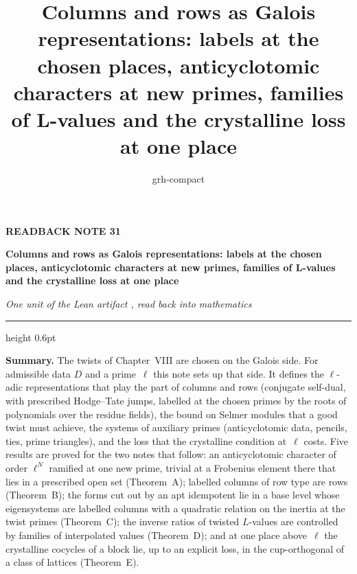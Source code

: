\documentclass[11pt,a4paper]{article}
\title{Columns and rows as Galois representations: labels at the chosen places, anticyclotomic characters at new primes, families of L-values and the crystalline loss at one place}
\author{grh-compact}
\date{}
\theoremstyle{plainx}
\theoremstyle{uprightx}
\begin{document}
\color{ink}

{\raggedright
{\sffamily\bfseries\fontsize{7.2}{9}\selectfont\color{leancol}READBACK NOTE 31\par}
\vspace{5pt}
{\fontsize{21.5}{25.5}\selectfont\bfseries Columns and rows as Galois representations: labels at the chosen places, anticyclotomic characters at new primes, families of L-values and the crystalline loss at one place\par}
\vspace{5pt}
{\fontsize{12.4}{16}\selectfont\itshape\color{inksoft} One unit of the Lean artifact \ArtifactName, read back into
mathematics\par}}
\vspace{8pt}
{\color{rulegrey}\hrule height 0.6pt}
\vspace{7pt}
\thispagestyle{empty}

\textbf{Summary.} The twists of Chapter~VIII are chosen on the Galois side. For admissible data $D$ and a prime~$\ell$
this note sets up that side. It defines the $\ell$-adic representations that play the part of columns and rows
(conjugate self-dual, with prescribed Hodge--Tate jumps, labelled at the chosen primes by the roots of polynomials
over the residue fields), the bound on Selmer modules that a good twist must achieve, the systems of auxiliary
primes (anticyclotomic data, pencils, ties, prime triangles), and the loss that the crystalline condition at~$\ell$
costs. Five results are proved for the two notes that follow: an anticyclotomic character of order $\ell^N$
ramified at one new prime, trivial at a Frobenius element there that lies in a prescribed open set (Theorem~A); labelled columns of row type are rows
(Theorem~B); the forms cut out by an apt idempotent lie in a base level whose eigensystems are labelled columns
with a quadratic relation on the inertia at the twist primes (Theorem~C); the inverse ratios of twisted $L$-values
are controlled by families of interpolated values (Theorem~D); and at one place above~$\ell$ the crystalline
cocycles of a block lie, up to an explicit loss, in the cup-orthogonal of a class of lattices (Theorem~E).
\end{document}
